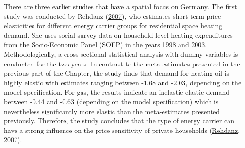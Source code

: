 \documentclass[12pt,twoside]{reedthesis}
\begin{document}
There are three earlier studies that have a spatial focus on Germany. The first study was conducted by Rehdanz (\protect\hyperlink{ref-rehdanz07}{2007}), who estimates short-term price elasticities for different energy carrier groups for residential space heating demand. She uses social survey data on household-level heating expenditures from the Socio-Economic Panel (SOEP) in the years 1998 and 2003. Methodologically, a cross-sectional statistical analysis with dummy variables is conducted for the two years. In contrast to the meta-estimates presented in the previous part of the Chapter, the study finds that demand for heating oil is highly elastic with estimates ranging between -1.68 and -2.03, depending on the model specification. For gas, the results indicate an inelastic elastic demand between -0.44 and -0.63 (depending on the model specification) which is nevertheless significantly more elastic than the meta-estimates presented previously. Therefore, the study concludes that the type of energy carrier can have a strong influence on the price sensitivity of private households (\protect\hyperlink{ref-rehdanz07}{Rehdanz, 2007}).
\end{document}
